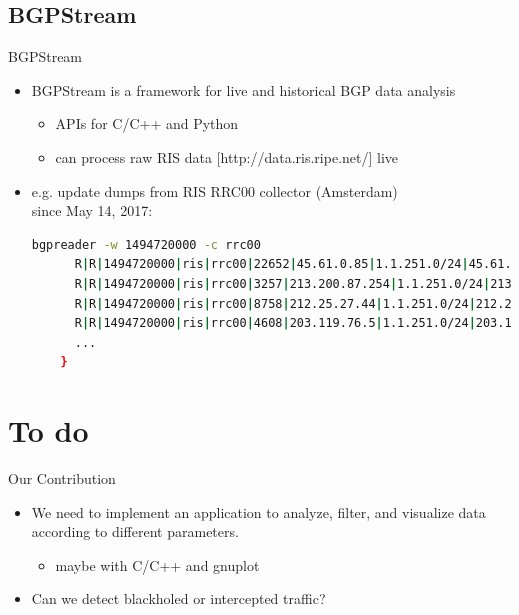 \documentclass[ucs,9pt]{beamer}
\begin{document}
\subsection{BGPStream}

\begin{frame}[fragile]{BGPStream}

  \begin{itemize}
  \item
    BGPStream is a framework for live and historical BGP data analysis
    \begin{itemize}
    \item
      APIs for C/C++ and Python
    \item
      can process raw RIS data [http://data.ris.ripe.net/] live
    \end{itemize}
  \item
    e.g. update dumps from RIS RRC00 collector (Amsterdam)\\since May 14, 2017:\\
    \begin{lstlisting}[language=sh]%[mathescape=false]
      bgpreader -w 1494720000 -c rrc00
      R|R|1494720000|ris|rrc00|22652|45.61.0.85|1.1.251.0/24|45.61.0.85|22652 6453 3491 38040 23969|23969|||
      R|R|1494720000|ris|rrc00|3257|213.200.87.254|1.1.251.0/24|213.200.87.254|3257 3491 38040 23969|23969|3257:8059 3257:30275 3257:50001 3257:54900 3257:54901||
      R|R|1494720000|ris|rrc00|8758|212.25.27.44|1.1.251.0/24|212.25.27.44|8758 8220 38040 23969|23969|8220:65010 8220:65401 8758:110 8758:300||
      R|R|1494720000|ris|rrc00|4608|203.119.76.5|1.1.251.0/24|203.119.76.5|4608 1221 4637 3491 38040 23969|23969|||
      ...
    }
    \end{lstlisting}
  \end{itemize}
\end{frame}

\section{To do}

\begin{frame}{Our Contribution}

  \begin{itemize}
  \item
    We need to implement an application to analyze, filter, and visualize data according to different parameters.
    \begin{itemize}
    \item
      maybe with C/C++ and gnuplot
    \end{itemize}
  \item
    Can we detect blackholed or intercepted traffic?
  \end{itemize}
\end{frame}
\end{document}
